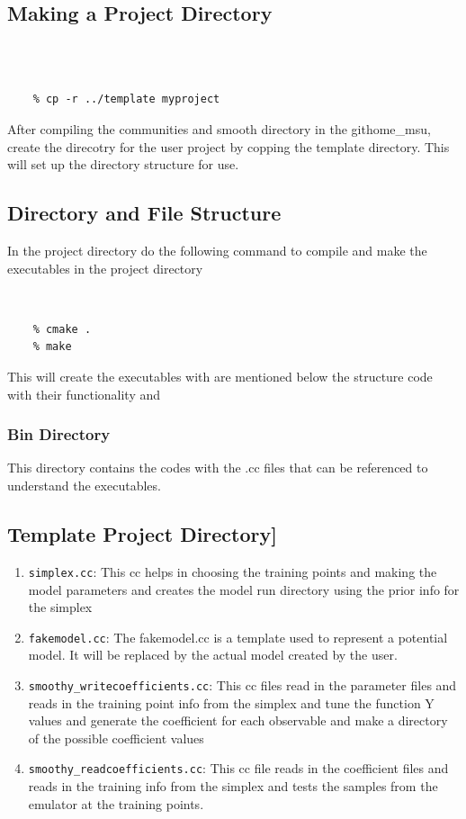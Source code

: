 \documentclass[12pt]{article}
\numberwithin{equation}{section}
\numberwithin{figure}{section}
\begin{document}
\subsection{Making a Project Directory}
{\tt 
\begin{verbatim}

    % cp -r ../template myproject
\end{verbatim}
}
After compiling the communities and smooth directory in the githome\_msu, create the direcotry for the user project by copping the template directory. This will set up the directory structure for use. 

\subsection{Directory and File Structure}

In the project directory do the following command to compile and make the executables in the project directory  

{\tt 
\begin{verbatim}
    % cmake . 
    % make  
\end{verbatim}
}

This will create the executables with are mentioned below the structure code with their functionality and 


\subsubsection{Bin Directory}

This directory contains the codes with the .cc files that can be referenced to understand the executables.

\subsection{Template Project Directory]}
\begin{enumerate}\itemsep=0pt
\item {\tt simplex.cc}: 
This cc helps in choosing the training points and making the model parameters and creates the model run directory using the prior info for the simplex 

\item {\tt fakemodel.cc}: 
The fakemodel.cc is a template used to represent a potential model. It will be replaced by the actual model created by the user. 

\item {\tt smoothy\_writecoefficients.cc}:
This cc files read in the parameter files and reads in the training point info from the simplex and tune the function Y values and generate the coefficient for each observable and make a directory of the possible coefficient values 

\item {\tt smoothy\_readcoefficients.cc}: 
This cc file reads in the coefficient files and reads in the training info from the simplex and tests the samples from the emulator at the training points. 
\end{enumerate}
\end{document}
